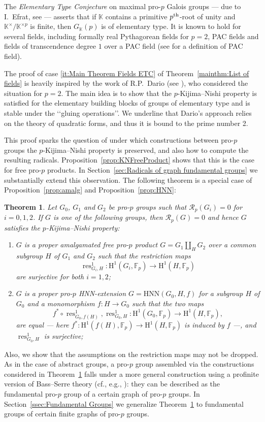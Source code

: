 \documentclass{amsart}
\newtheorem{mainthm}{Theorem}
\theoremstyle{definition}
\theoremstyle{remark}
\DeclareMathOperator{\res}{res}
\newcommand{\KK}{\mathbb{K}}
\newcommand{\FF}{\mathbb{F}}
\newcommand{\calR}{\mathcal{R}}
\newcommand{\rmH}{\mathrm H}%
\newcommand{\F}{\FF}
\newcommand{\pth}{{p^{\rm th}}}
\begin{document}
The \emph{Elementary Type Conjecture} on maximal pro-$p$ Galois groups --- due to I.~Efrat, see \cite{ETC1,ETC2} --- asserts that if $\KK$ contains a primitive $\pth$-root of unity and $\KK^\times/\KK^{\times p}$ is finite, then $G_\KK(p)$ is of elementary type. It is known to hold for several fields, including formally real Pythagorean fields for $p=2$, PAC fields and fields of transcendence degree $1$ over a PAC field (see \cite{FriedJarden2023} for a definition of PAC field).

The proof of case \ref{it:Main Theorem Fields ETC} of Theorem~\ref{mainthm:List of fields} is heavily inspired by the work of R.P.~Dario (see \cite{Dario}), who considered the situation for $p=2$. The main idea is to show that the $p$-Kijima--Nishi property is satisfied for the elementary building blocks of groups of elementary type and is stable under the \lq\lq gluing operations\rq\rq. 
We underline that Dario’s approach relies on the theory of quadratic
forms, and thus it is bound to the prime number 2.

This proof sparks the question of under which constructions between pro-$p$ groups the $p$-Kijima--Nishi property is preserved, and also how to compute the resulting radicals. Proposition~\ref{prop:KNFreeProduct} shows that this is the case for free pro-$p$ products. In Section~\ref{sec:Radicals of graph fundamental groups} we substantially extend this observation. The following theorem is a special case of Proposition~\ref{prop:amalg} and Proposition~\ref{prop:HNN}:
\begin{mainthm}\label{mainthm:amalg HNN}
Let $G_0$, $G_1$ and $G_2$ be pro-$p$ groups such that $\calR_p(G_i)=0$ for $i=0,1,2$. If $G$ is one of the following groups, then $\calR_p(G)=0$ and hence $G$ satisfies the $p$-Kijima--Nishi property:
\begin{enumerate}[label=(\roman*)]
     \item $G$ is a proper amalgamated free pro-$p$ product $G=G_1\amalg_H G_2$ over a common subgroup $H$ of $G_1$ and $G_2$ such that the restriction maps
     $$\res_{G_i,H}^1\colon \rmH^1(G_i,\F_p)\to\rmH^1(H,\F_p)$$ are surjective for both $i=1,2$;
     \item $G$ is a {\rm proper} pro-$p$ HNN-extension $G=\mathrm{HNN}(G_0,H,f)$ for a subgroup $H$ of $G_0$ and a monomorphism $f\colon H\to G_0$ such that the two maps
     $$f^\ast\circ\res_{G_0,f(H)}^1,\res_{G_0,H}^1\colon \rmH^1(G_0,\F_p)\longrightarrow\rmH^1(H,\F_p),$$
     are equal --- here $f^\ast\colon\rmH^1(f(H),\F_p)\to\rmH^1(H,\F_p)$ is induced by $f$ ---, and $\res_{G_0,H}^1$ is surjective;
 \end{enumerate}
\end{mainthm}
Also, we show that the assumptions on the restriction maps may not be dropped. As in the case of abstract groups, a pro-$p$ group assembled via the constructions considered in Theorem~\ref{mainthm:amalg HNN} falls under a more general construction using a profinite version of Bass--Serre theory (cf., e.g., \cite{RZ:newhorizons,Rib17}): they can be described as the fundamental pro-$p$ group of a certain graph of pro-$p$ groups.
In Section~\ref{ssec:Fundamental Groups} we generalize Theorem~\ref{mainthm:amalg HNN} to fundamental groups of certain finite graphs of pro-$p$ groups.
\end{document}
